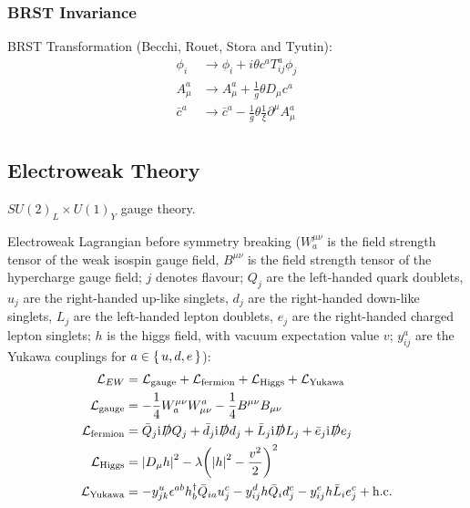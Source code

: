 		\subsubsection{BRST Invariance}
			BRST Transformation (Becchi, Rouet, Stora and Tyutin):
			\begin{equation}
				\begin{aligned}
					\phi_i &\rightarrow \phi_i + i\theta c^a T^a_{ij} \phi_j \\
					A^a_\mu &\rightarrow A^a_\mu + \frac{1}{g}\theta D_\mu c^a \\
					\bar{c}^a &\rightarrow \bar{c}^a - \frac{1}{g} \theta \frac{1}{\xi} \partial^\mu A^a_\mu \\
				\end{aligned}
			\end{equation}
	
	\subsection{Electroweak Theory}
		$SU(2)_L \times U(1)_Y$ gauge theory.

		Electroweak Lagrangian before symmetry breaking ($W_a^{\mu\nu}$ is the field strength tensor of the weak isospin gauge field, $B^{\mu\nu}$ is the field strength tensor of the hypercharge gauge field; $j$ denotes flavour; $Q_j$ are the left-handed quark doublets, $u_j$ are the right-handed up-like singlets, $d_j$ are the right-handed down-like singlets, $L_j$ are the left-handed lepton doublets, $e_j$ are the right-handed charged lepton singlets; $h$ is the higgs field, with vacuum expectation value $v$; $y^a_{ij}$ are the Yukawa couplings for $a \in \set{u,d,e}$):
		\begin{equation}
			\begin{aligned}
				\mathcal{L}_{EW} &= \mathcal{L}_{\text{gauge}} + \mathcal{L}_{\text{fermion}} + \mathcal{L}_{\text{Higgs}} + \mathcal{L}_{\text{Yukawa}} \\
				\mathcal{L}_{\text{gauge}} &= -\frac{1}{4} W_a^{\mu\nu} W^a_{\mu\nu} -\frac{1}{4} B^{\mu\nu} B_{\mu\nu} \\
				\mathcal{L}_{\text{fermion}} &= \bar{Q}_j \mathrm{i} \slashed{D} Q_j + \bar{d}_j \mathrm{i} \slashed{D} d_j + \bar{L}_j \mathrm{i} \slashed{D} L_j + \bar{e}_j \mathrm{i} \slashed{D} e_j \\
				\mathcal{L}_{\text{Higgs}} &= \abs{D_\mu h}^2 - \lambda\qty(\abs{h}^2 -\frac{v^2}{2})^2 \\
				\mathcal{L}_{\text{Yukawa}} &= - y^u_{jk} \epsilon^{ab} h^\dagger_b \bar{Q}_{ia}  u_j^c - y^d_{ij} h \bar{Q}_i d_j^c - y^e_{ij} h \bar{L}_i e_j^c + \text{h.c.}
			\end{aligned}
		\end{equation}

